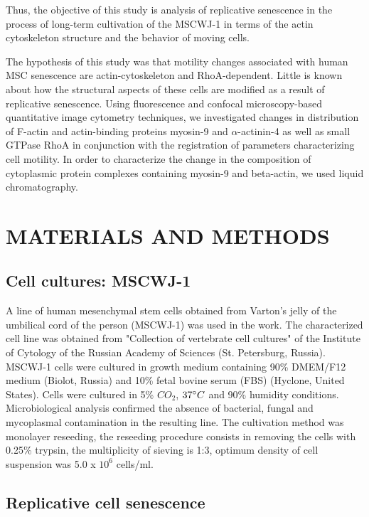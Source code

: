 \documentclass[english,authoryear]{elsarticle}
\begin{document}
Thus, the objective of this study is analysis of replicative senescence in the process of long-term cultivation of the MSCWJ-1 in terms of the actin cytoskeleton structure and the behavior of moving cells.


The hypothesis of this study was that motility changes associated with human MSC senescence are actin-cytoskeleton and RhoA-dependent.
Little is known about how the structural aspects of these cells are modified as a result of replicative senescence.
Using fluorescence and confocal microscopy-based quantitative image cytometry techniques, we investigated changes in distribution of F-actin and actin-binding proteins myosin-9 and $\alpha$-actinin-4 as well as small GTPase RhoA in conjunction with the registration of parameters characterizing cell motility.
In order to characterize the change in the composition of cytoplasmic protein complexes containing myosin-9 and beta-actin, we used liquid chromatography.



\section{MATERIALS AND METHODS}

\subsection{Cell cultures: MSCWJ-1}

A line of human mesenchymal stem cells obtained from Varton's jelly of the umbilical cord of the person (MSCWJ-1) was used in the work.
The characterized cell line was obtained from "Collection of vertebrate cell cultures" of the Institute of Cytology of the Russian Academy of Sciences (St. Petersburg, Russia).
MSCWJ-1 cells were cultured in growth medium containing 90\% DMEM/F12 medium (Biolot, Russia) and 10\% fetal bovine serum (FBS) (Hyclone, United States).
Cells were cultured in 5\% $CO_2$, $37\degree C$ and 90\% humidity conditions.
Microbiological analysis confirmed the absence of bacterial, fungal and mycoplasmal contamination in the resulting line.
The cultivation method was monolayer reseeding, the reseeding procedure consists in removing the cells with 0.25\% trypsin, the multiplicity of sieving is 1:3, optimum density of cell suspension was 5.0 x $10^{6}$ cells/ml.

\subsection{Replicative cell senescence}
\end{document}
